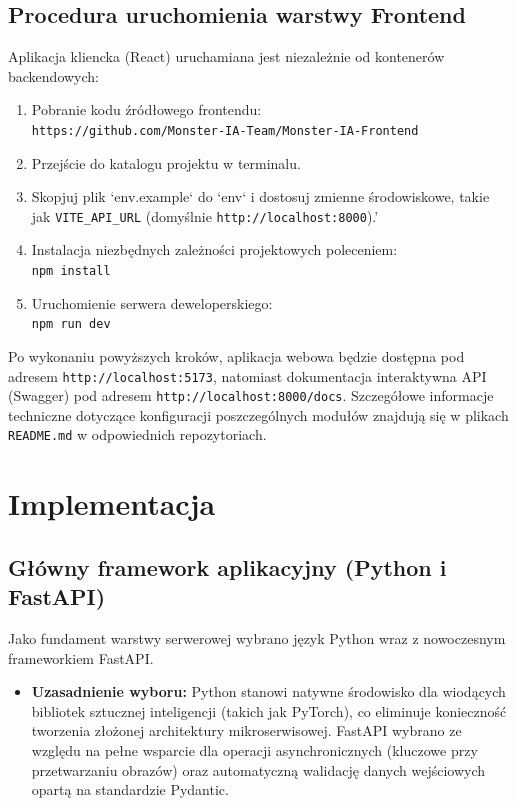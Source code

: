 \documentclass[12pt,a4paper]{article}
\begin{document}
\subsection{Procedura uruchomienia warstwy Frontend}
Aplikacja kliencka (React) uruchamiana jest niezależnie od kontenerów backendowych:
\begin{enumerate}
    \item Pobranie kodu źródłowego frontendu: \\ \texttt{https://github.com/Monster-IA-Team/Monster-IA-Frontend}
    \item Przejście do katalogu projektu w terminalu.
    \item Skopjuj plik `env.example` do `env` i dostosuj zmienne środowiskowe, takie jak \texttt{VITE\_API\_URL} (domyślnie \texttt{http://localhost:8000}).'
    \item Instalacja niezbędnych zależności projektowych poleceniem: \\ \texttt{npm install}
    \item Uruchomienie serwera deweloperskiego: \\ \texttt{npm run dev}
\end{enumerate}

Po wykonaniu powyższych kroków, aplikacja webowa będzie dostępna pod adresem \texttt{http://localhost:5173}, natomiast dokumentacja interaktywna API (Swagger) pod adresem \texttt{http://localhost:8000/docs}. Szczegółowe informacje techniczne dotyczące konfiguracji poszczególnych modułów znajdują się w plikach \texttt{README.md} w odpowiednich repozytoriach.

\section{Implementacja}

\subsection{Główny framework aplikacyjny (Python i FastAPI)}
Jako fundament warstwy serwerowej wybrano język Python wraz z nowoczesnym frameworkiem FastAPI.
\begin{itemize}
    \item \textbf{Uzasadnienie wyboru:} Python stanowi natywne środowisko dla wiodących bibliotek sztucznej inteligencji (takich jak PyTorch), co eliminuje konieczność tworzenia złożonej architektury mikroserwisowej. FastAPI wybrano ze względu na pełne wsparcie dla operacji asynchronicznych (kluczowe przy przetwarzaniu obrazów) oraz automatyczną walidację danych wejściowych opartą na standardzie Pydantic.
\end{itemize}
\end{document}
